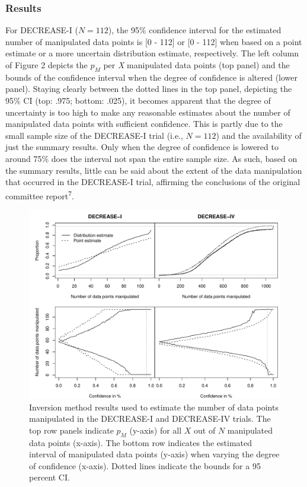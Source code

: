\documentclass[]{article}
\begin{document}
\subsubsection{Results}\label{results-2}

For DECREASE-I (\(N=112\)), the 95\% confidence interval for the
estimated number of manipulated data points is {[}0 - 112{]} or {[}0 -
112{]} when based on a point estimate or a more uncertain distribution
estimate, respectively. The left column of Figure 2 depicts the \(p_M\)
per \emph{X} manipulated data points (top panel) and the bounds of the
confidence interval when the degree of confidence is altered (lower
panel). Staying clearly between the dotted lines in the top panel,
depicting the 95\% CI (top: .975; bottom: .025), it becomes apparent
that the degree of uncertainty is too high to make any reasonable
estimates about the number of manipulated data points with sufficient
confidence. This is partly due to the small sample size of the
DECREASE-I trial (i.e., \(N=112\)) and the availability of just the
summary results. Only when the degree of confidence is lowered to around
75\% does the interval not span the entire sample size. As such, based
on the summary results, little can be said about the extent of the data
manipulation that occurred in the DECREASE-I trial, affirming the
conclusions of the original committee report\textsuperscript{7}.

\begin{figure}

{\centering \includegraphics[width=0.8\linewidth]{../figures/fig3} 

}

\caption{Inversion method results used to estimate the number of data points manipulated in the DECREASE-I and DECREASE-IV trials. The top row panels indicate $p_M$ (y-axis) for all $X$ out of $N$ manipulated data points (x-axis). The bottom row indicates the estimated interval of manipulated data points (y-axis) when varying the degree of confidence (x-axis). Dotted lines indicate the bounds for a 95 percent CI.}\label{fig:figure 3}
\end{figure}
\end{document}
